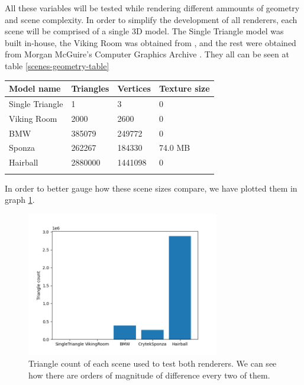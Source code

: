 All these variables will be tested while rendering different ammounts of geometry and scene complexity. In order to simplify the development of all renderers, each scene will be comprised of a single 3D model. The Single Triangle model was built in-house, the Viking Room was obtained from \cite{VulkanTutorial}, and the rest were obtained from Morgan McGuire's Computer Graphics Archive \cite{McGuire2022Data}. They all can be seen at table \ref{scenes-geometry-table}

\begin{center}
  \begin{tabular}{ | m{3cm} | m{3cm}| m{3cm}|m{3cm} |}
  \hline
  Model name& Triangles& Vertices& Texture size\\
  \hline
    Single Triangle& 1& 3& 0\\
  \hline
    Viking Room& 2000& 2600& 0\\
  \hline
    BMW& 385079& 249772& 0\\
  \hline
    Sponza& 262267& 184330& 74.0 MB\\
  \hline
    Hairball& 2880000& 1441098&0\\
  \label{scenes-geometry-table}
\end{tabular}
\end{center}

In order to better gauge how these scene sizes compare, we have plotted them in graph \ref{scenes-geometry-graph}.

\begin{figure}[hbt!]
  \centering
  \includegraphics[width=0.75\textwidth]{figuras/scenes-geometry.png}
  \caption{Triangle count of each scene used to test both renderers. We can see how there are orders of magnitude of difference every two of them.}
  \label{scenes-geometry-graph}
\end{figure}

